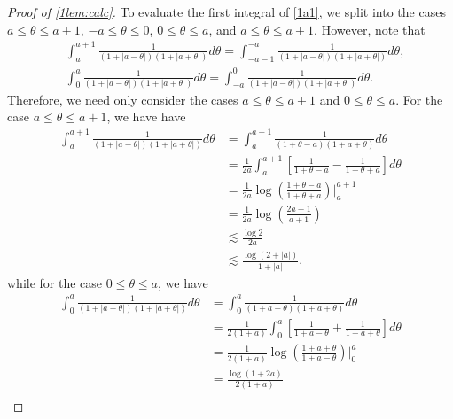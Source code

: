 \begin{proof}[Proof of \cref{1lem:calc}]
To evaluate the first integral of \eqref{1a1}, we split into the cases $a \le \theta \le
a+1$, $-a \le \theta \le 0$, $0 \le \theta \le a$, and $a \le \theta \le a+1$.
However, note that 
%
%
\begin{equation*}
	\begin{split}
		& \int_{a}^{a+1} \frac{1}{(1 + | a - \theta |)(1 + | a + \theta |)}d \theta =
		\int_{-a-1}^{-a} \frac{1}{(1 + | a - \theta |)(1 + | a + \theta |)}d \theta,
		\\
		& \int_{0}^{a} \frac{1}{(1 + | a - \theta |)(1 + | a + \theta |)}d \theta =
		\int_{-a}^{0} \frac{1}{(1 + | a - \theta |)(1 + | a + \theta |)}d \theta.
	\end{split}
\end{equation*}
%
%
Therefore, we need only consider the cases $a \le \theta \le a+1$ and $0 \le
\theta \le a$. For the case $a \le \theta \le a+1$, we have have
%
%
\begin{equation*}
	\begin{split}
		\int_{a}^{a+1} \frac{1}{(1 + | a-\theta |)(1 + | a + \theta |)}d \theta
		& = \int_{a}^{a+1} \frac{1}{(1 + \theta -a)(1 + a + \theta)}d \theta
		\\
		& = \frac{1}{2a} \int_{a}^{a+1} \left[ \frac{1}{1 + \theta -a} -
		\frac{1}{1 + \theta + a}  \right]d \theta
		\\
		& =\frac{1}{2a} \log\left( \frac{1 + \theta -a}{1 + \theta + a} \right) \Big
		|_a^{a+1}
		\\
		& = \frac{1}{2a} \log\left( \frac{2a+1}{a+1} \right)
		\\
		& \lesssim\frac{\log 2}{2a}
		\\
		& \lesssim \frac{\log(2 + | a |)}{1 + | a |}.
	\end{split}
\end{equation*}
%
%
while for the case $0 \le \theta \le a$, we have
%
%
\begin{equation*}
	\begin{split}
		\int_{0}^{a} \frac{1}{(1 + | a - \theta |)(1 + | a + \theta |)}d \theta
		& = \int_{0}^{a} \frac{1}{(1 +  a - \theta )(1 +  a + \theta )}d \theta
		\\
		& = \frac{1}{2(1 + a)} \int_{0}^{a} \left[ \frac{1}{1 + a - \theta} +
		\frac{1}{1 + a + \theta} \right]d \theta
		\\
		& = \frac{1}{2(1 + a)} \log \left( \frac{1 + a + \theta}{1 + a - \theta}
		\right) \Big |_{0}^{a}
		\\
		& = \frac{\log\left( 1 + 2a \right)}{2\left( 1 + a \right)}
		\\

\end{split}
\end{equation*}
\end{proof}
